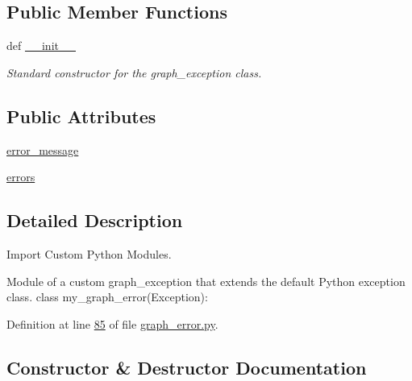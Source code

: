 \subsection*{Public Member Functions}
\begin{DoxyCompactItemize}
\item 
def \hyperlink{classutilities_1_1custom__exceptions_1_1graph__error_1_1graph__error_af1cd1f51b69ad2fc3af0521ae2922535}{\+\_\+\+\_\+init\+\_\+\+\_\+}
\begin{DoxyCompactList}\small\item\em Standard constructor for the graph\+\_\+exception class. \end{DoxyCompactList}\end{DoxyCompactItemize}
\subsection*{Public Attributes}
\begin{DoxyCompactItemize}
\item 
\hyperlink{classutilities_1_1custom__exceptions_1_1graph__error_1_1graph__error_a98eabd7ef4fec2794e8b88e3af478de6}{error\+\_\+message}
\item 
\hyperlink{classutilities_1_1custom__exceptions_1_1graph__error_1_1graph__error_abc34ad82ec3f8374e1ff60c5c888a3eb}{errors}
\end{DoxyCompactItemize}


\subsection{Detailed Description}
Import Custom Python Modules. 

Module of a custom graph\+\_\+exception that extends the default Python exception class. class my\+\_\+graph\+\_\+error(\+Exception)\+: 

Definition at line \hyperlink{graph__error_8py_source_l00085}{85} of file \hyperlink{graph__error_8py_source}{graph\+\_\+error.\+py}.



\subsection{Constructor \& Destructor Documentation}
\hypertarget{classutilities_1_1custom__exceptions_1_1graph__error_1_1graph__error_af1cd1f51b69ad2fc3af0521ae2922535}{}
